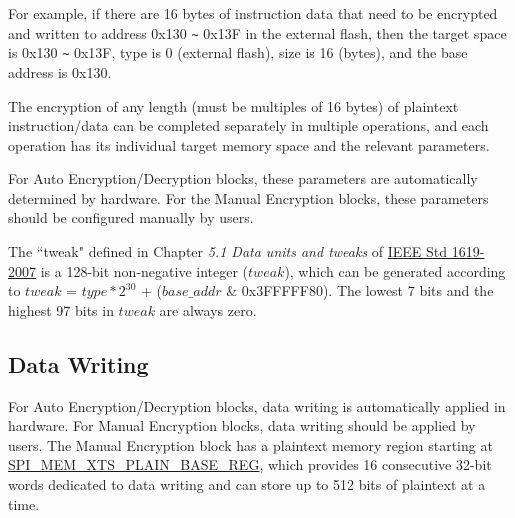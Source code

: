 \documentclass[main\_\_EN.tex]{subfiles}
\begin{document}
For example, if there are 16 bytes of instruction data that need to be encrypted and written to address 0x130 \verb+~+ 0x13F in the external flash, then the target space is 0x130 \verb+~+ 0x13F, type is 0 (external flash), size is 16 (bytes), and the base address is 0x130.

The encryption of any length (must be multiples of 16 bytes) of plaintext instruction/data can be completed separately in multiple operations, and each operation has its individual target memory space and the relevant parameters.

For Auto Encryption/Decryption blocks, these parameters are automatically determined by hardware. For the Manual Encryption blocks, these parameters should be configured manually by users.

\begin{tiplisting}
\vspace{-2em}
\begin{enumerate}
    The ``tweak" defined in Chapter \textit{5.1 Data units and tweaks} of \href{https://ieeexplore.ieee.org/document/4493450}{IEEE Std 1619-2007} is a 128-bit non-negative integer (\begin{math} tweak \end{math}), which can be generated according to \begin{math} tweak \end{math} = \begin{math} type * 2^{30}\end{math} + (\begin{math} base\_addr \end{math} \& 0x3FFFFF80). The lowest 7 bits and the highest 97 bits in \begin{math} tweak \end{math} are always zero.
\end{enumerate}
\end{tiplisting}

\subsection{Data Writing}
\label{sec:extmemncr-data-writing}

For Auto Encryption/Decryption blocks, data writing is automatically applied in hardware. For Manual Encryption blocks, data writing should be applied by users. The Manual Encryption block has a plaintext memory region starting at \hyperref[regdesc:SPIMEMXTSPLAINBASEREG]{SPI\_MEM\_XTS\_PLAIN\_BASE\_REG}, which provides 16 consecutive 32-bit words dedicated to data writing and can store up to 512 bits of plaintext at a time.
\end{document}

